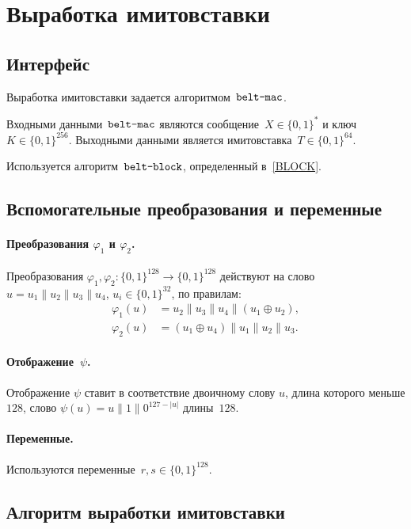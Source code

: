 \section{Выработка имитовставки}\label{MAC}

\subsection{Интерфейс}\label{MAC.IFace}

Выработка имитовставки задается алгоритмом~$\texttt{belt-mac}$.

Входными данными~$\texttt{belt-mac}$ являются
сообщение~$X\in\{0,1\}^*$ и ключ~$K\in\{0,1\}^{256}$.
%
Выходными данными является имитовставка~$T\in\{0,1\}^{64}$.

Используется алгоритм~$\texttt{belt-block}$, 
определенный в~\ref{BLOCK}.

\subsection{Вспомогательные преобразования и переменные}\label{MAC.Aux}

\paragraph{Преобразования $\varphi_1$ и $\varphi_2$.}
Преобразования $\varphi_1,\varphi_2\colon\{0,1\}^{128}\to\{0,1\}^{128}$
действуют на слово 
$u=u_1\parallel u_2\parallel u_3\parallel u_4$, 
$u_i\in\{0,1\}^{32}$, по правилам:
\begin{align*}
\varphi_1(u)&=u_2\parallel u_3\parallel u_4\parallel(u_1\oplus u_2),\\
\varphi_2(u)&=(u_1\oplus u_4)\parallel u_1\parallel u_2\parallel u_3.
\end{align*}

\paragraph{Отображение~$\psi$.}
Отображение $\psi$ ставит в соответствие двоичному слову $u$,
длина которого меньше $128$, слово
$
\psi(u)=u\parallel 1\parallel 0^{127-|u|}
$
длины~$128$.

\paragraph{Переменные.}
Используются переменные~$r,s\in\{0,1\}^{128}$.

\subsection{Алгоритм выработки имитовставки}\label{MAC.Alg}

